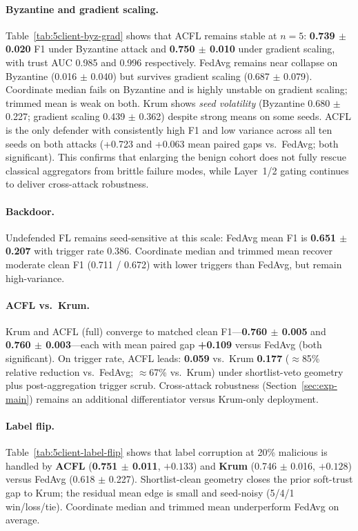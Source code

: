 \paragraph{Byzantine and gradient scaling.}
Table~\ref{tab:5client-byz-grad} shows that ACFL remains stable at $n{=}5$: \textbf{0.739 $\pm$ 0.020} F1 under Byzantine attack and \textbf{0.750 $\pm$ 0.010} under gradient scaling, with trust AUC 0.985 and 0.996 respectively.
FedAvg remains near collapse on Byzantine (0.016 $\pm$ 0.040) but survives gradient scaling (0.687 $\pm$ 0.079).
Coordinate median fails on Byzantine and is highly unstable on gradient scaling; trimmed mean is weak on both.
Krum shows \emph{seed volatility} (Byzantine 0.680 $\pm$ 0.227; gradient scaling 0.439 $\pm$ 0.362) despite strong means on some seeds.
ACFL is the only defender with consistently high F1 and low variance across all ten seeds on both attacks (+0.723 and +0.063 mean paired gaps vs.\ FedAvg; both significant).
This confirms that enlarging the benign cohort does not fully rescue classical aggregators from brittle failure modes, while Layer~1/2 gating continues to deliver cross-attack robustness.

\paragraph{Backdoor.}
Undefended FL remains seed-sensitive at this scale: FedAvg mean F1 is \textbf{0.651 $\pm$ 0.207} with trigger rate 0.386.
Coordinate median and trimmed mean recover moderate clean F1 (0.711 / 0.672) with lower triggers than FedAvg, but remain high-variance.

\paragraph{ACFL vs.\ Krum.}
Krum and ACFL (full) converge to matched clean F1---\textbf{0.760 $\pm$ 0.005} and \textbf{0.760 $\pm$ 0.003}---each with mean paired gap \textbf{+0.109} versus FedAvg (both significant).
On trigger rate, ACFL leads: \textbf{0.059} vs.\ Krum \textbf{0.177} ($\approx$85\% relative reduction vs.\ FedAvg; $\approx$67\% vs.\ Krum) under shortlist-veto geometry plus post-aggregation trigger scrub.
Cross-attack robustness (Section~\ref{sec:exp-main}) remains an additional differentiator versus Krum-only deployment.

\paragraph{Label flip.}
Table~\ref{tab:5client-label-flip} shows that label corruption at 20\% malicious is handled by \textbf{ACFL} (\textbf{0.751 $\pm$ 0.011}, $+0.133$) and \textbf{Krum} (0.746 $\pm$ 0.016, $+0.128$) versus FedAvg (0.618 $\pm$ 0.227).
Shortlist-clean geometry closes the prior soft-trust gap to Krum; the residual mean edge is small and seed-noisy (5/4/1 win/loss/tie).
Coordinate median and trimmed mean underperform FedAvg on average.

